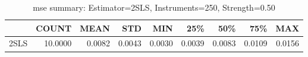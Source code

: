 \begin{table}[ht]
\centering
\caption{mse summary: Estimator=2SLS, Instruments=250, Strength=0.50}
\begin{tabular}{lrrrrrrrr}
\toprule
 & COUNT & MEAN & STD & MIN & 25\% & 50\% & 75\% & MAX \\
\midrule
2SLS & 10.0000 & 0.0082 & 0.0043 & 0.0030 & 0.0039 & 0.0083 & 0.0109 & 0.0156 \\
\bottomrule
\end{tabular}
\end{table}
